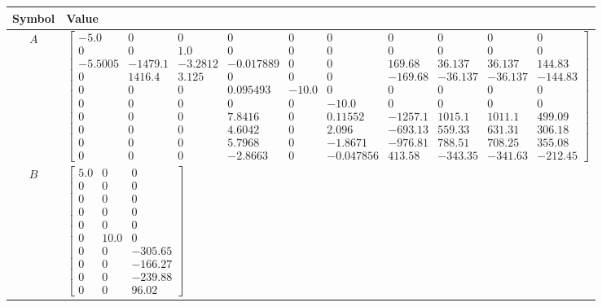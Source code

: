 \begin{tabular}{cl}
\hline
  Symbol  & Value                                                                                                                                                                                                                                                                                                                                                                                                                                                                                                                                                                                                                                                                               \\
\hline
   $A$    & $\left[\begin{matrix}-5.0 & 0 & 0 & 0 & 0 & 0 & 0 & 0 & 0 & 0\\0 & 0 & 1.0 & 0 & 0 & 0 & 0 & 0 & 0 & 0\\-5.5005 & -1479.1 & -3.2812 & -0.017889 & 0 & 0 & 169.68 & 36.137 & 36.137 & 144.83\\0 & 1416.4 & 3.125 & 0 & 0 & 0 & -169.68 & -36.137 & -36.137 & -144.83\\0 & 0 & 0 & 0.095493 & -10.0 & 0 & 0 & 0 & 0 & 0\\0 & 0 & 0 & 0 & 0 & -10.0 & 0 & 0 & 0 & 0\\0 & 0 & 0 & 7.8416 & 0 & 0.11552 & -1257.1 & 1015.1 & 1011.1 & 499.09\\0 & 0 & 0 & 4.6042 & 0 & 2.096 & -693.13 & 559.33 & 631.31 & 306.18\\0 & 0 & 0 & 5.7968 & 0 & -1.8671 & -976.81 & 788.51 & 708.25 & 355.08\\0 & 0 & 0 & -2.8663 & 0 & -0.047856 & 413.58 & -343.35 & -341.63 & -212.45\end{matrix}\right]$ \\
   $B$    & $\left[\begin{matrix}5.0 & 0 & 0\\0 & 0 & 0\\0 & 0 & 0\\0 & 0 & 0\\0 & 0 & 0\\0 & 10.0 & 0\\0 & 0 & -305.65\\0 & 0 & -166.27\\0 & 0 & -239.88\\0 & 0 & 96.02\end{matrix}\right]$                                                                                                                                                                                                                                                                                                                                                                                                                                                                                                    \\

\end{tabular}

